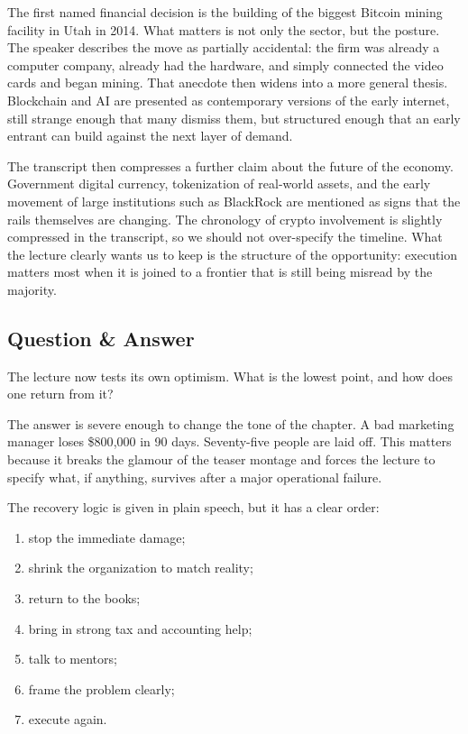 The first named financial decision is the building of the biggest Bitcoin mining facility in Utah in 2014. What matters is not only the sector, but the posture. The speaker describes the move as partially accidental: the firm was already a computer company, already had the hardware, and simply connected the video cards and began mining. That anecdote then widens into a more general thesis. Blockchain and AI are presented as contemporary versions of the early internet, still strange enough that many dismiss them, but structured enough that an early entrant can build against the next layer of demand.

The transcript then compresses a further claim about the future of the economy. Government digital currency, tokenization of real-world assets, and the early movement of large institutions such as BlackRock are mentioned as signs that the rails themselves are changing. The chronology of crypto involvement is slightly compressed in the transcript, so we should not over-specify the timeline. What the lecture clearly wants us to keep is the structure of the opportunity: execution matters most when it is joined to a frontier that is still being misread by the majority.

\subsection{Question \& Answer}

The lecture now tests its own optimism. What is the lowest point, and how does one return from it?

The answer is severe enough to change the tone of the chapter. A bad marketing manager loses \$800{,}000 in 90 days. Seventy-five people are laid off. This matters because it breaks the glamour of the teaser montage and forces the lecture to specify what, if anything, survives after a major operational failure.

The recovery logic is given in plain speech, but it has a clear order:

\begin{enumerate}
\item stop the immediate damage;
\item shrink the organization to match reality;
\item return to the books;
\item bring in strong tax and accounting help;
\item talk to mentors;
\item frame the problem clearly;
\item execute again.
\end{enumerate}

